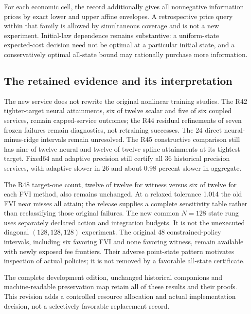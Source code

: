 
For each economic cell, the record additionally gives all nonnegative information prices by exact lower and upper affine envelopes. A retrospective price query within that family is allowed by simultaneous coverage and is not a new experiment. Initial-law dependence remains substantive: a uniform-state expected-cost decision need not be optimal at a particular initial state, and a conservatively optimal all-state bound may rationally purchase more information.

\subsection{The retained evidence and its interpretation}
The new service does not rewrite the original nonlinear training studies. The R42 tighter-target neural attainments, six of twelve scalar and five of six coupled services, remain capped-service outcomes; the R44 residual refinements of seven frozen failures remain diagnostics, not retraining successes. The 24 direct neural-minus-ridge intervals remain unresolved. The R45 constructive comparison still has nine of twelve neural and twelve of twelve spline attainments at its tightest target. Fixed64 and adaptive precision still certify all 36 historical precision services, with adaptive slower in 26 and about 0.98 percent slower in aggregate.

The R48 target-one count, twelve of twelve for witness versus six of twelve for each FVI method, also remains unchanged. At a relaxed tolerance 1.014 the old FVI near misses all attain; the release supplies a complete sensitivity table rather than reclassifying those original failures. The new common $N=128$ state rung uses separately declared action and integration budgets. It is not the unexecuted diagonal $(128,128,128)$ experiment. The original 48 constrained-policy intervals, including six favoring FVI and none favoring witness, remain available with newly exposed fee frontiers. Their adverse point-state pattern motivates inspection of actual policies; it is not removed by a favorable all-state certificate.

The complete development edition, unchanged historical companions and machine-readable preservation map retain all of these results and their proofs. This revision adds a controlled resource allocation and actual implementation decision, not a selectively favorable replacement record.
